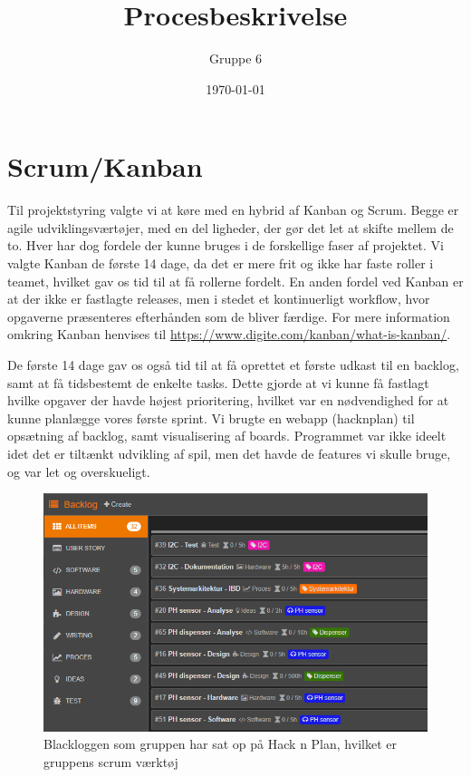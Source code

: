 \documentclass[a4paper, 12pt]{article}
\begin{document}
\title{Procesbeskrivelse}
\author{Gruppe 6}
\date{\today}
\maketitle

\newpage
{}
\tableofcontents
\newpage

\section{Scrum/Kanban}
Til projektstyring valgte vi at køre med en hybrid af Kanban og Scrum. Begge er agile udviklingsværtøjer, med en del ligheder, der gør det let at skifte mellem de to. Hver har dog fordele der kunne bruges i de forskellige faser af projektet. Vi valgte Kanban de første 14 dage, da det er mere frit og ikke har faste roller i teamet, hvilket gav os tid til at få rollerne fordelt. En anden fordel ved Kanban er at der ikke er fastlagte releases, men i stedet et kontinuerligt workflow, hvor opgaverne præsenteres efterhånden som de bliver færdige. For mere information omkring Kanban henvises til \url{https://www.digite.com/kanban/what-is-kanban/}.

De første 14 dage gav os også tid til at få oprettet et første udkast til en backlog, samt at få tidsbestemt de enkelte tasks. Dette gjorde at vi kunne få fastlagt hvilke opgaver der havde højest prioritering, hvilket var en nødvendighed for at kunne planlægge vores første sprint. Vi brugte en webapp (hacknplan) til opsætning af backlog, samt visualisering af boards. Programmet var ikke ideelt idet det er tiltænkt udvikling af spil, men det havde de features vi skulle bruge, og var let og overskueligt.

\begin{figure}[h!]
\centering
\includegraphics[width=1\textwidth]{"HnP Backlog"}
\caption{Blackloggen som gruppen har sat op på Hack n Plan, hvilket er gruppens scrum værktøj}
\label{image-backlog}
\end{figure}
\end{document}
